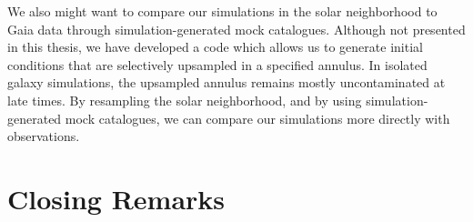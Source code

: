 We also might want to compare our simulations in the solar neighborhood to Gaia data through simulation-generated mock catalogues. Although not presented in this thesis, we have developed a code which allows us to generate initial conditions that are selectively upsampled in a specified annulus. In isolated galaxy simulations, the upsampled annulus remains mostly uncontaminated at late times. By resampling the solar neighborhood, and by using simulation-generated mock catalogues, we can compare our simulations more directly with observations.

\section{Closing Remarks}






